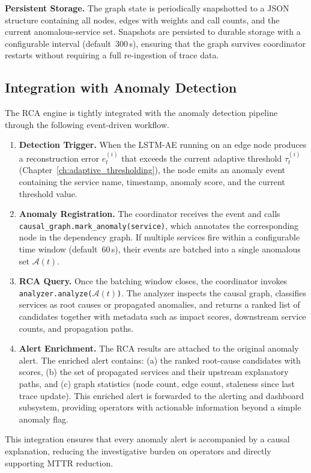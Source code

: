 \textbf{Persistent Storage.} The graph state is periodically snapshotted to a
JSON structure containing all nodes, edges with weights and call counts, and
the current anomalous-service set. Snapshots are persisted to durable storage
with a configurable interval (default~300\,s), ensuring that the graph
survives coordinator restarts without requiring a full re-ingestion of trace
data.

\subsection{Integration with Anomaly Detection}
\label{subsec:rca_integration}

The RCA engine is tightly integrated with the anomaly detection pipeline
through the following event-driven workflow.

\begin{enumerate}
    \item \textbf{Detection Trigger.} When the LSTM-AE running on an edge node
    produces a reconstruction error $e_t^{(i)}$ that exceeds the current
    adaptive threshold $\tau_t^{(i)}$
    (Chapter~\ref{ch:adaptive_thresholding}), the node emits an anomaly event
    containing the service name, timestamp, anomaly score, and the current
    threshold value.

    \item \textbf{Anomaly Registration.} The coordinator receives the event
    and calls \\ \texttt{causal\_graph.mark\_anomaly(service)}, which annotates
    the corresponding node in the dependency graph. If multiple services fire
    within a configurable time window (default~60\,s), their events are batched
    into a single anomalous set $\mathcal{A}(t)$.

    \item \textbf{RCA Query.} Once the batching window closes, the coordinator
    invokes \texttt{analyzer.analyze($\mathcal{A}(t)$)}. The analyzer inspects
    the causal graph, classifies services as root causes or propagated
    anomalies, and returns a ranked list of candidates together with metadata
    such as impact scores, downstream service counts, and propagation paths.

    \item \textbf{Alert Enrichment.} The RCA results are attached to the
    original anomaly alert. The enriched alert contains: (a) the ranked
    root-cause candidates with scores, (b) the set of propagated services and
    their upstream explanatory paths, and (c) graph statistics (node count,
    edge count, staleness since last trace update). This enriched alert is
    forwarded to the alerting and dashboard subsystem, providing operators with
    actionable information beyond a simple anomaly flag.
\end{enumerate}

This integration ensures that every anomaly alert is accompanied by a causal
explanation, reducing the investigative burden on operators and directly
supporting MTTR reduction.
